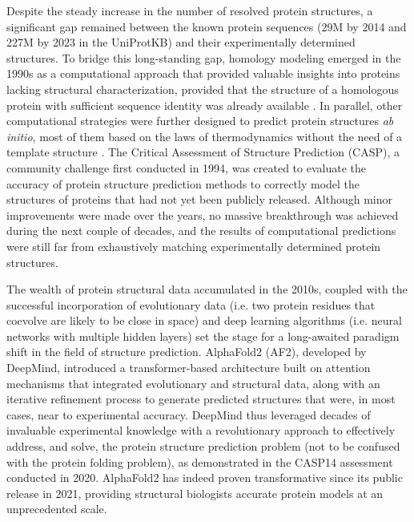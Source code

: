 Despite the steady increase in the number of resolved protein structures, a significant gap remained between the known protein sequences (29M by 2014 and 227M by 2023 in the UniProtKB) and their experimentally determined structures\cite{the_uniprot_consortium_uniprot_2023}. To bridge this long-standing gap, homology modeling emerged in the 1990s as a computational approach that provided valuable insights into proteins lacking structural characterization, provided that the structure of a homologous protein with sufficient sequence identity was already available \cite{marti-renom_comparative_2000, schwede_swiss-model_2003}. In parallel, other computational strategies were further designed to predict protein structures \textit{ab initio}, most of them based on the laws of thermodynamics without the need of a template structure \cite{bertoline_before_2023}. The Critical Assessment of Structure Prediction (CASP), a community challenge first conducted in 1994, was created to evaluate the accuracy of protein structure prediction methods to correctly model the structures of proteins that had not yet been publicly released\cite{moult_largescale_1995}. Although minor improvements were made over the years, no massive breakthrough was achieved during the next couple of decades, and the results of computational predictions were still far from exhaustively matching experimentally determined protein structures\cite{moult_critical_2018}.

The wealth of protein structural data accumulated in the 2010s, coupled with the successful incorporation of evolutionary data (i.e. two protein residues that coevolve are likely to be close in space) and deep learning algorithms (i.e. neural networks with multiple hidden layers) set the stage for a long-awaited paradigm shift in the field of structure prediction. AlphaFold2 (AF2), developed by DeepMind, introduced a transformer-based architecture built on attention mechanisms that integrated evolutionary and structural data, along with an iterative refinement process to generate predicted structures that were, in most cases, near to experimental accuracy\cite{jumper_highly_2021}. DeepMind thus leveraged decades of invaluable experimental knowledge with a revolutionary approach to effectively address, and solve, the protein structure prediction problem (not to be confused with the protein folding problem), as demonstrated in the CASP14 assessment conducted in 2020\cite{pereira_highaccuracy_2021}. AlphaFold2 has indeed proven transformative since its public release in 2021, providing structural biologists accurate protein models at an unprecedented scale\cite{tunyasuvunakool_highly_2021, bryant_improved_2022, wong_benchmarking_2022}.  

